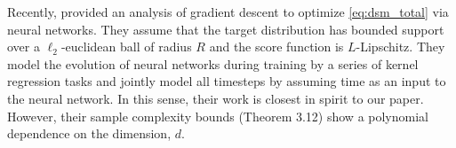 Recently, \cite{han2024neural} provided an analysis of gradient descent to optimize \eqref{eq:dsm_total} via neural networks. They assume that the target distribution has bounded support over a $\ell_{2}$-euclidean ball of radius $R$ and the score function is $L$-Lipschitz. They model the evolution of neural
networks during training by a series of kernel regression tasks and jointly model all timesteps by assuming time as an input to the neural network. In this sense, their work is closest in spirit to our paper. However, their sample complexity bounds (Theorem 3.12) show a polynomial dependence on the dimension, $d$.